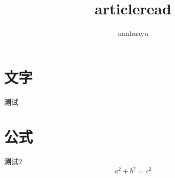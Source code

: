 \documentclass[UTF8]{ctexart}
\begin{document}
\title{articleread}
\author{nanhuayu}
\maketitle

\section{文字}
测试
\section{公式}
测试2
\[
a^2 + b^2 = c^2
\]
\end{document}
